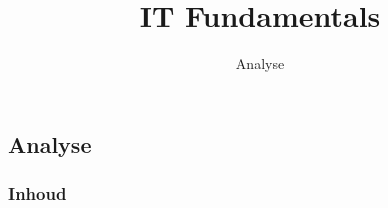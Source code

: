 \documentclass{beamer}
\title{IT Fundamentals}
\author{\LARGE Analyse }
\date{}
\begin{document}
\begin{frame}
  \titlepage
\end{frame}


\section*{}
\subsection*{Analyse}
\begin{frame}
\frametitle{Inhoud}
 \tableofcontents[hideallsubsections]
\end{frame}






\end{document}
